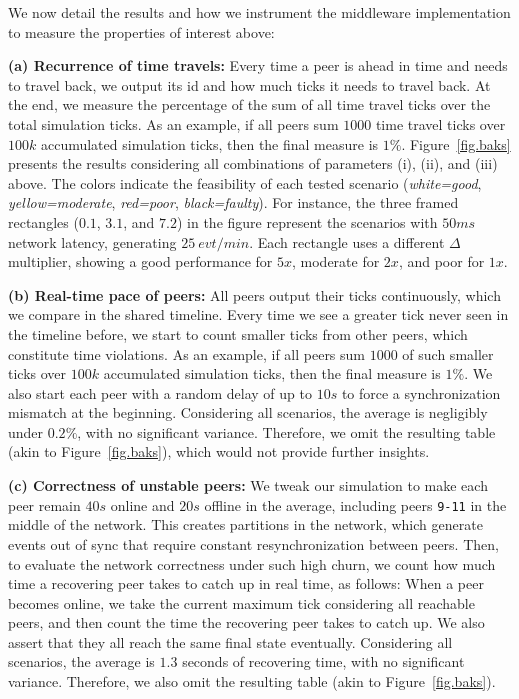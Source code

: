 \documentclass[12pt]{article}
\newcommand{\code}[1]  {\texttt{\small{#1}}}
\begin{document}
We now detail the results and how we instrument the middleware implementation
to measure the properties of interest above:

\textbf{(a) Recurrence of time travels:}
Every time a peer is ahead in time and needs to travel back, we output its id
and how much ticks it needs to travel back.
At the end, we measure the percentage of the sum of all time travel ticks over
the total simulation ticks.
As an example, if all peers sum $1000$ time travel ticks over $100k$
accumulated simulation ticks, then the final measure is $1\%$.
%
Figure~\ref{fig.baks} presents the results considering all combinations of
parameters (i), (ii), and (iii) above.
The colors indicate the feasibility of each tested scenario
    (\emph{white=good}, \emph{yellow=moderate}, \emph{red=poor},
    \emph{black=faulty}).
%
For instance, the three framed rectangles ($0.1$, $3.1$, and $7.2$) in the
figure represent the scenarios with $50ms$ network latency, generating
$25~evt/min$.
Each rectangle uses a different $\Delta$ multiplier, showing a good performance
for $5x$, moderate for $2x$, and poor for $1x$.

\textbf{(b) Real-time pace of peers:}
All peers output their ticks continuously, which we compare in the shared
timeline.
Every time we see a greater tick never seen in the timeline before, we start to
count smaller ticks from other peers, which constitute time violations.
As an example, if all peers sum $1000$ of such smaller ticks over $100k$
accumulated simulation ticks, then the final measure is $1\%$.
%
We also start each peer with a random delay of up to $10s$ to force a
synchronization mismatch at the beginning.
%
Considering all scenarios, the average is negligibly under $0.2\%$, with no
significant variance.
Therefore, we omit the resulting table (akin to Figure~\ref{fig.baks}), which
would not provide further insights.

\textbf{(c) Correctness of unstable peers:}
We tweak our simulation to make each peer remain $40s$ online and $20s$
offline in the average, including peers \code{9-11} in the middle of the
network.
This creates partitions in the network, which generate events out of sync that
require constant resynchronization between peers.
%
Then, to evaluate the network correctness under such high churn, we count how
much time a recovering peer takes to catch up in real time, as follows:
When a peer becomes online, we take the current maximum tick considering all
reachable peers, and then count the time the recovering peer takes to catch up.
We also assert that they all reach the same final state eventually.
%
Considering all scenarios, the average is $1.3$ seconds of recovering time,
with no significant variance.
Therefore, we also omit the resulting table (akin to Figure~\ref{fig.baks}).
\end{document}
